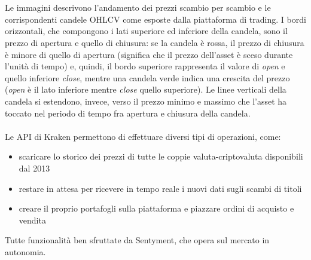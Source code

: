 \documentclass[a4paper,12pt]{report}
\begin{document}
\\~\\Le immagini descrivono l'andamento dei prezzi scambio per scambio e le corrispondenti candele OHLCV come esposte dalla piattaforma di trading. I bordi orizzontali, che compongono i lati superiore ed inferiore della candela, sono il prezzo di apertura e quello di chiusura: se la candela è rossa, il prezzo di chiusura è minore di quello di apertura (significa che il prezzo dell'asset è sceso durante l'unità di tempo) e, quindi, il bordo superiore rappresenta il valore di \textit{open} e quello inferiore \textit{close}, mentre una candela verde indica una crescita del prezzo (\textit{open} è il lato inferiore mentre \textit{close} quello superiore). Le linee verticali della candela si estendono, invece, verso il prezzo minimo e massimo che l'asset ha toccato nel periodo di tempo fra apertura e chiusura della candela.
\\~\\
Le API di Kraken permettono di effettuare diversi tipi di operazioni, come:
\begin{itemize}
	\item scaricare lo storico dei prezzi di tutte le coppie valuta-criptovaluta disponibili dal 2013
	\item restare in attesa per ricevere in tempo reale i nuovi dati sugli scambi di titoli
	\item creare il proprio portafogli sulla piattaforma e piazzare ordini di acquisto e vendita
\end{itemize}
Tutte funzionalità ben sfruttate da Sentyment, che opera sul mercato in autonomia.
\end{document}
